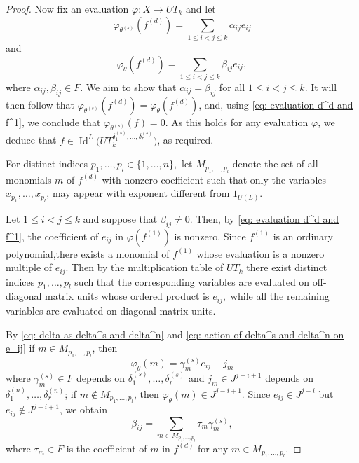 \documentclass[a4paper,reqno]{amsart}
\theoremstyle{definition}
\numberwithin{equation}{section}
\numberwithin{theorem}{section}
\DeclareMathOperator{\I}{Id}
\begin{document}
\begin{proof}

Now fix an evaluation  $\varphi:X \longrightarrow UT_k$ and let 
\begin{equation*}
    \varphi_{\theta^{(s)}}(f^{(d)})= \sum_{1\leq i < j \leq k} \alpha_{ij} e_{ij}
\end{equation*}
and 
\begin{equation*}
    \varphi_{\theta}(f^{(d)})=  \sum_{1\leq i < j \leq k} \beta_{ij} e_{ij},
\end{equation*}
where $\alpha_{ij},\beta_{ij}\in F.$  
We aim to show that $\alpha_{ij}=\beta_{ij}$ for all $1\leq i < j \leq k$. It will then follow that  
$\varphi_{\theta^{(s)}}(f^{(d)})=\varphi_{\theta}(f^{(d)})$,
and, using \eqref{eq: evaluation d^d and f^1}, we conclude that
$ \varphi_{\theta^{(s)}}(f)=0$.
As this holds for any evaluation $\varphi$, we deduce that $f\in \I^L \big( UT_k^{\delta_1^{(s)}, \ldots, \delta_r^{(s)}}\big)$, as required.



For distinct indices
$
p_1,\ldots,p_l\in\{1,\ldots,n\},
$
let $M_{p_1,\ldots, p_l}$ denote the set of all monomials $m$ of $f^{(d)}$ with  nonzero coefficient such that only the variables $x_{p_1}, \ldots, x_{p_l}$, may appear with exponent different from $1_{U(L)}$.



Let $1\leq i < j \leq k$ and suppose that   $\beta_{ij}\neq 0$. 
Then, by \eqref{eq: evaluation d^d and f^1}, the coefficient of $e_{ij}$ in  $\varphi(f^{(1)})$ is nonzero.
Since $f^{(1)}$ is an ordinary polynomial,there exists a monomial of $f^{(1)}$ whose evaluation is a nonzero multiple of $e_{ij}.$ Then by the
multiplication table of $UT_k$  there exist distinct indices $p_1, \ldots, p_l$ such that the corresponding variables are evaluated on off-diagonal matrix units whose ordered product is $e_{ij},$ while all the remaining variables are evaluated on diagonal matrix units.

 By \eqref{eq: delta as delta^s and delta^n} and \eqref{eq: action of delta^s and delta^n on e_ij} if $m\in M_{p_1,\ldots, p_l}$, then
 $$\varphi_{\theta}(m)=\gamma_m^{(s)} e_{ij}+ j_m$$
where $\gamma_m^{(s)}
\in F$ depends  on $\delta_1^{(s)}, \ldots, \delta_r^{(s)}$ and $j_m\in J^{j-i+1}$ depends on  $\delta_1^{(n)}, \ldots, \delta_r^{(n)}$; if $m\notin M_{p_1,\ldots, p_l}$, then
$ \varphi_{\theta}(m)\in J^{j-i+1}.$
Since $e_{ij}\in J^{j-i}$ but $e_{ij}\notin J^{j-i+1}$, we obtain
$$
\beta_{ij}= \sum_{m\in M_{p_1,\ldots, p_l}} \tau_m  \gamma_m^{(s)},
$$
where $\tau_m\in F$ is the coefficient of $m$ in $f^{(d)}$ for any $m\in M_{p_1,\ldots, p_l}$. 


\end{proof}
\end{document}
